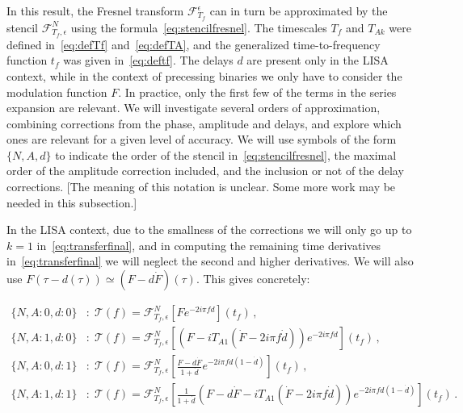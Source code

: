 \documentclass[aps,showpacs,twocolumn,
prd,superscriptaddress,nofootinbib]{revtex4-1}
\newcommand\calF{{\mathcal{F}}}
\newcommand\calT{{\mathcal{T}}}
\newcommand{\Tf}{T_{f}}
\newcommand{\jgb}[1]{{\color{DarkGreen} #1}}
\begin{document}
In this result, the Fresnel transform $\calF^{\epsilon}_{\Tf}$ can in turn be approximated by the stencil $\calF^{N}_{\Tf, \epsilon}$ using the formula~\eqref{eq:stencilfresnel}. The timescales $\Tf$ and $T_{Ak}$ were defined in~\eqref{eq:defTf} and~\eqref{eq:defTA}, and the generalized time-to-frequency function $t_{f}$ was given in~\eqref{eq:deftf}. The delays $d$ are present only in the LISA context, while in the context of precessing binaries we only have to consider the modulation function $F$. In practice, only the first few of the terms in the series expansion are relevant. We will investigate several orders of approximation, combining corrections from the phase, amplitude and delays, and explore which ones are relevant for a given level of accuracy. We will use symbols of the form $\{N,A,d\}$ to indicate the order of the stencil in~\eqref{eq:stencilfresnel}, the maximal order of the amplitude correction included, and the inclusion or not of the delay corrections. \jgb{[The meaning of this notation is unclear. Some more work may be needed in this subsection.]}

In the LISA context, due to the smallness of the corrections we will only go up to $k=1$ in~\eqref{eq:transferfinal}, and in computing the remaining time derivatives in~\eqref{eq:transferfinal} we will neglect the second and higher derivatives. We will also use $F(\tau - d(\tau)) \simeq (F - d \dot{F})(\tau)$. This gives concretely:
\begin{widetext}
\begin{subequations}
\begin{align}
	\{N,A:0,d:0\}&: \; \calT(f) = \calF^{N}_{\Tf, \epsilon} \left[ F e^{-2i\pi f d} \right] (t_{f}) \,, \\
	\{N,A:1,d:0\}&: \; \calT(f) = \calF^{N}_{\Tf, \epsilon} \left[ \left(F - i T_{A1} \left( \dot{F} - 2i\pi f \dot{d}\right) \right) e^{-2i\pi f d} \right] (t_{f}) \,, \\
	\{N,A:0,d:1\}&: \; \calT(f) = \calF^{N}_{\Tf, \epsilon} \left[ \frac{F - d\dot{F}}{1+\dot{d}} e^{-2i\pi f d (1-\dot{d})} \right] (t_{f})\,, \\
	\{N,A:1,d:1\}&: \; \calT(f) = \calF^{N}_{\Tf, \epsilon} \left[ \frac{1}{1+\dot{d}}\left(  F - d\dot{F} - i T_{A1} \left( \dot{F} - 2i\pi f \dot{d} \right) \right) e^{-2i\pi f d (1 - \dot{d})} \right] (t_{f})\,.
\end{align}
\end{subequations}
\end{widetext}
\end{document}
